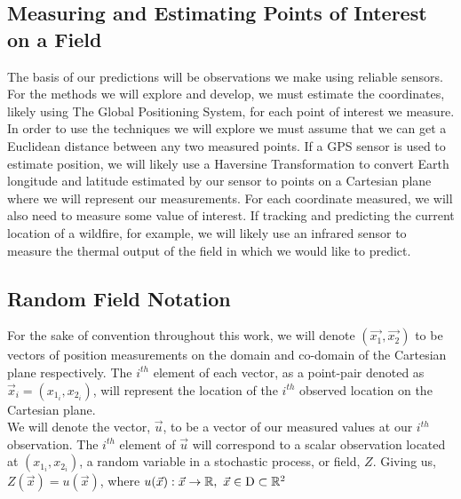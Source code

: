 \documentclass[11pt]{ucthesis}
\begin{document}
\subsection{Measuring and Estimating Points of Interest on a Field}
The basis of our predictions will be observations we make using reliable sensors. For the methods we will explore and develop, we must estimate the coordinates, likely using The Global Positioning System, for each point of interest we measure. In order to use the techniques we will explore we must assume that we can get a Euclidean distance between any two measured points. If a GPS sensor is used to estimate position, we will likely use a Haversine Transformation to convert Earth longitude and latitude estimated by our sensor to points on a Cartesian plane where we will represent our measurements. For each coordinate measured, we will also need to measure some value of interest. If tracking and predicting the current location of a wildfire, for example, we will likely use an infrared sensor to measure the thermal output of the field in which we would like to predict.\\

\subsection{Random Field Notation}
For the sake of convention throughout this work, we will denote $(\vec{x_1}, \vec{x_2})$ to be vectors of position measurements on the domain and co-domain of the Cartesian plane respectively. The $i^{th}$ element of each vector, as a point-pair denoted as $\vec{x}_i = (x_{1_i}, x_{2_i})$, will represent the location of the $i^{th}$ observed location on the Cartesian plane.\\
We will denote the vector, $\vec{u}$, to be a vector of our measured values at our $i^{th}$ observation. The $i^{th}$ element of $\vec{u}$ will correspond to a scalar observation located at $(x_{1_i}, x_{2_i})$, a random variable in a stochastic process, or field, $Z$. Giving us, $Z(\vec{x})=u(\vec{x})$, where $u(\vec{x}): \vec{x} \rightarrow \mathbb{R},\ \vec{x} \in \rm{D} \subset \mathbb{R}^2$\\
\end{document}
